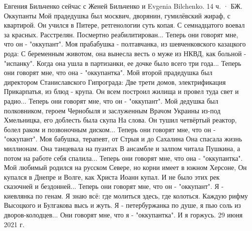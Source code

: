 \documentclass[a4paper,11pt]{extreport}
\begin{document}
Евгения Бильченко сейчас с Женей Бильченко и Evgenia Bilchenko.
14 ч. ·
БЖ. Оккупанты
Мой прадедушка был москвич, дворянин, гумилёвский жираф, с квартирой.
Он учился в Питере, ретгенологии суть копая.
С семнадцатого воевал за красных. Расстрелян. Посмертно реабилитирован...
Теперь они говорят мне, что он - "оккупант".
Моя прабабушка - полтавчанка, из шевченковского казацкого рода:
С беременным животом, она вынесла весть о муже из НКВД, как больной - "испанку".
Когда она ушла в партизанки, ее дочке было всего три года...
Теперь они говорят мне, что она - "оккупантка".
Мой второй прадедушка был директором Станиславского Гипрограда:
Две трети домов, электрификация Прикарпатья, из блюд - крупа.
Он всем построил жилища и провел туда свет и радио...
Теперь они говорят мне, что он - "оккупант".
Мой дедушка был полковником, героем Чернобыля и заслуженным
Врачом Украины из-под Хмельницка, его доблесть была скупа
На слова. Он тушил четвёртый реактор, болел раком и позвоночным диском...
Теперь они говорят мне, что он - "оккупант".
Моя бабушка, терапевт, от Стрыя и до Сахалина
Она спасала жизнь миллионам. Она танцевала на пуантах
В ансамбле и залпом читала Пушкина, а потом на работе себя спалила...
Теперь они говорят мне, что она - "оккупантка".
Мой любимый родился на русском Севере, но корни имеет в южном Херсоне,
Он купался в Днепре и Волге, как Христа Иоанн купал.
И не было этих рек сказочней и бездонней...
Теперь они говорят мне, что он - "оккупант".
Я - киевлянка по генам. Я знаю всё: где молиться здесь, где колоться.
Каждую рифму Высоцкого и Булгакова высь и жуть.
Я - петербуржанка по душе, я пью соль из дворов-колодцев...
Они говорят мне, что я - "оккупантка".
И я горжусь.
29 июня 2021 г.
\end{document}
